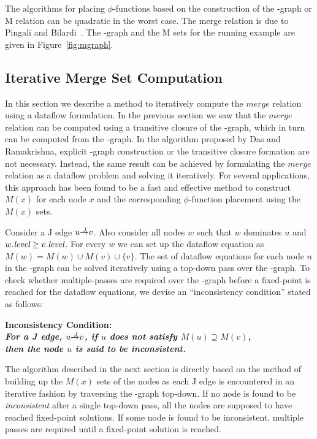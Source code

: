 {The algorithms for placing $\phi$-functions based on the construction of the 
\DF-graph or M relation can be quadratic in the worst case. The merge relation 
is due to Pingali and Bilardi~\cite{bilardi}. The \DF-graph and the M sets for the running 
example are given in Figure~\ref{fig:mgraph}.

\subsection{Iterative Merge Set Computation}
In this section we describe a method to iteratively compute the 
$\textit{merge}$ relation using a dataflow formulation. In the previous section 
we saw that the $\textit{merge}$ relation can be computed using a transitive 
closure of the \DF-graph, which in turn can be computed from the \DJ-graph. In 
the algorithm proposed by Das and Ramakrishna, explicit \DF-graph construction 
or the transitive closure formation are not necessary. Instead, the same result 
can be achieved by formulating the $\textit{merge}$ relation as a dataflow 
problem and solving it iteratively. For several applications, this approach has 
been found to be a fast and effective method to construct $M(x)$ for each node 
$x$ and the corresponding $\phi$-function placement using the $M(x)$ sets. 

Consider a J edge $u \st{J} v$. Also consider all nodes $w$ such that $w$ 
dominates $u$ and $w.\textit{level} \geq v.\textit{level}$. For every $w$ we can set up the 
dataflow equation as $M(w) = M(w) \cup M(v) \cup \{v\}$. The set of dataflow 
equations for each node $n$ in the \DJ-graph can be solved iteratively using a 
top-down pass over the \DJ-graph. To check whether multiple-passes are required 
over the \DJ-graph before a fixed-point is reached for the dataflow equations, 
we devise an ``inconsistency condition'' stated as follows:

\begin{center}
\bf{Inconsistency Condition:}\\
\it{For a J edge, $u \st{J} v$, if $u$ does not satisfy
$M(u)\supseteq M(v)$,\\ then the node $u$ is said to be inconsistent}. 
\end{center}

The algorithm described in the next section is directly based on the method of building
up the $M(x)$ sets of the nodes as each J edge is encountered in an iterative fashion by
traversing the \DJ-graph top-down. If no node is found to be \emph{inconsistent} after a single 
top-down pass, all the nodes are supposed to have reached fixed-point solutions. If some node
is found to be inconsistent, multiple passes are required until a fixed-point solution is reached.


}
